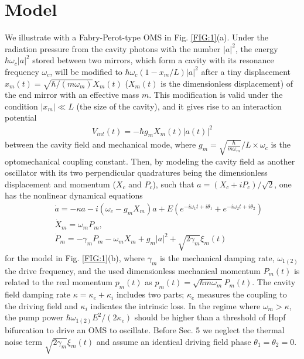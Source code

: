 \documentclass[a4paper,fleqn]{cas-dc}
\begin{document}
\section{Model}
We illustrate with a Fabry-Perot-type OMS in Fig. \ref{FIG:1}(a). Under the radiation pressure from the cavity photons with the number $|a|^2$, the energy $\hbar\omega_c|a|^2$ stored between two mirrors, which form a cavity with its resonance frequency $\omega_c$, will be modified to $\hbar\omega_c(1-x_m/L)|a|^2$ after a tiny displacement $x_m(t)=\sqrt{\hbar/(m\omega_m)}X_m(t)$ ($X_m(t)$ is the dimensionless displacement) of the end mirror with an effective mass $m$. This modification is valid under the condition $|x_m|\ll L$ (the size of the cavity), and it gives rise 
to an interaction potential 
\begin{eqnarray}
V_{int}(t)=-\hbar g_mX_m(t)|a(t)|^2
\label{potential}
\end{eqnarray}
between the cavity field and mechanical mode, where $g_m=\sqrt{\frac{\hbar}{m\omega_m}}/L\times \omega_c$ is the optomechanical coupling constant.
Then, by modeling the cavity field as another oscillator with its two perpendicular quadratures being the dimensionless displacement and momentum ($X_c$ and $P_c$), such that $a=(X_c+iP_c)/\sqrt{2}$, one has the nonlinear dynamical equations 
\begin{eqnarray}
&&\dot{a}=-\kappa a-i(\omega_c-g_mX_m)a+E(e^{-i\omega_1 t+i\theta_1}+e^{-i\omega_2 t+i\theta_2})\nonumber\\
&&\dot{X}_m=\omega_mP_m,\nonumber\\
&&\dot{P}_m=-\gamma_mP_m-\omega_mX_m+g_m|a|^2+\sqrt{2\gamma_m}\xi_m(t)
\label{2}
\end{eqnarray}
for the model in Fig. \ref{FIG:1}(b), where $\gamma_m$ is the mechanical damping rate, $\omega_{1(2)}$ the drive frequency, and the used dimensionless mechanical momentum $P_m(t)$ is related to the real momentum $p_m(t)$ as $p_m(t)=\sqrt{\hbar m\omega_m}P_m(t)$. The cavity field damping rate 
$\kappa=\kappa_e+\kappa_i$ includes two parts; $\kappa_e$ measures the coupling to the driving field and $\kappa_i$ indicates the intrinsic loss. In the regime where $\omega_m>\kappa$, the pump power $\hbar\omega_{1(2)}E^2/(2\kappa_e)$ should be higher than a threshold of Hopf bifurcation to drive an OMS to oscillate. Before Sec. 5 we neglect the thermal noise term $\sqrt{2\gamma_m}\xi_m(t)$ and assume an identical driving field phase $\theta_1=\theta_2=0$.
\end{document}
